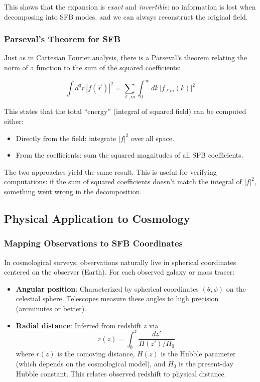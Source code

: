 This shows that the expansion is \emph{exact} and \emph{invertible}: no information is lost when decomposing into SFB modes, and we can always reconstruct the original field.

\subsubsection{Parseval's Theorem for SFB}

Just as in Cartesian Fourier analysis, there is a Parseval's theorem relating the norm of a function to the sum of the squared coefficients:

\begin{equation}
\int d^3 r \, |f(\vec{r})|^2 = \sum_{\ell, m} \int_0^\infty dk \, |f_{\ell m}(k)|^2
\label{eq:parseval_sfb}
\end{equation}

This states that the total ``energy'' (integral of squared field) can be computed either:
\begin{itemize}
    \item Directly from the field: integrate $|f|^2$ over all space.
    \item From the coefficients: sum the squared magnitudes of all SFB coefficients.
\end{itemize}

The two approaches yield the same result. This is useful for verifying computations: if the sum of squared coefficients doesn't match the integral of $|f|^2$, something went wrong in the decomposition.

\subsection{Physical Application to Cosmology}

\subsubsection{Mapping Observations to SFB Coordinates}

In cosmological surveys, observations naturally live in spherical coordinates centered on the observer (Earth). For each observed galaxy or mass tracer:
\begin{itemize}
    \item \textbf{Angular position}: Characterized by spherical coordinates $(\theta, \phi)$ on the celestial sphere. Telescopes measure these angles to high precision (arcminutes or better).
    \item \textbf{Radial distance}: Inferred from redshift $z$ via
    \begin{equation}
    r(z) = \int_0^z \frac{dz'}{H(z')/H_0}
    \end{equation}
    where $r(z)$ is the comoving distance, $H(z)$ is the Hubble parameter (which depends on the cosmological model), and $H_0$ is the present-day Hubble constant. This relates observed redshift to physical distance.
\end{itemize}

